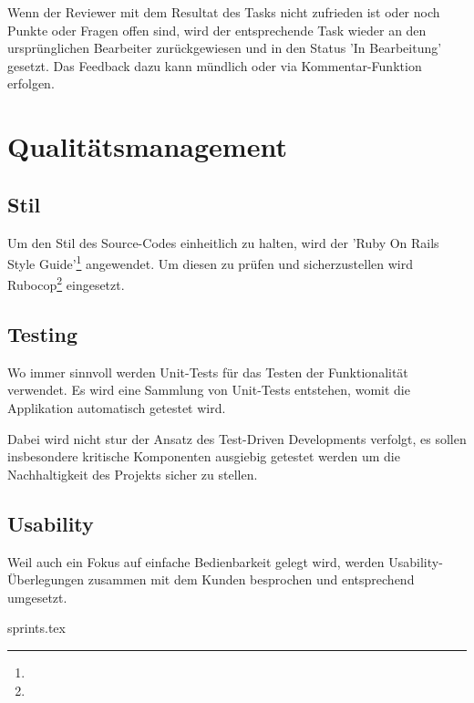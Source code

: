 Wenn der Reviewer mit dem Resultat des Tasks nicht zufrieden ist oder noch Punkte oder Fragen offen sind, wird der entsprechende Task wieder an den ursprünglichen Bearbeiter zurückgewiesen und in den Status 'In Bearbeitung' gesetzt. Das Feedback dazu kann mündlich oder via Kommentar-Funktion erfolgen.

\section{Qualitätsmanagement}

\subsection*{Stil}

Um den Stil des Source-Codes einheitlich zu halten, wird der 'Ruby On Rails Style Guide'\footnote{} angewendet. Um diesen zu prüfen und sicherzustellen wird Rubocop\footnote{} eingesetzt.

\subsection*{Testing}

Wo immer sinnvoll werden Unit-Tests für das Testen der Funktionalität verwendet. Es wird eine Sammlung von Unit-Tests entstehen, womit die Applikation automatisch getestet wird.

Dabei wird nicht stur der Ansatz des Test-Driven Developments verfolgt, es sollen insbesondere kritische Komponenten ausgiebig getestet werden um die Nachhaltigkeit des Projekts sicher zu stellen.

\subsection*{Usability}

Weil auch ein Fokus auf einfache Bedienbarkeit gelegt wird, werden Usability-Überlegungen zusammen mit dem Kunden besprochen und entsprechend umgesetzt.

\xxx

{sprints.tex}
